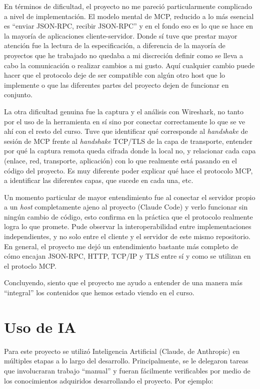 \documentclass[11pt]{article}
\begin{document}
En términos de dificultad, el proyecto no me pareció particularmente complicado
a nivel de implementación. El modelo mental de MCP, reducido a lo más esencial es
\enquote{enviar JSON-RPC, recibir JSON-RPC} y en el fondo eso es lo que se hace en
la mayoría de aplicaciones cliente-servidor. Donde sí tuve que prestar mayor atención fue
la lectura de la especificación, a diferencia de la mayoría de proyectos que he trabajado
no quedaba a mi discreción definir como se lleva a cabo la comunicación o realizar cambios
a mi gusto. Aquí cualquier cambio puede hacer que el protocolo deje de ser compatible
con algún otro host que lo implemente o que las diferentes partes del proyecto dejen
de funcionar en conjunto.

La otra dificultad genuina fue la captura y el análisis con Wireshark, no
tanto por el uso de la herramienta en sí sino por conectar correctamente
lo que se ve ahí con el resto del curso. Tuve que identificar qué corresponde al
\emph{handshake} de sesión de MCP frente al \emph{handshake} TCP/TLS de la
capa de transporte, entender por qué la captura remota queda cifrada donde
la local no, y relacionar cada capa (enlace, red, transporte, aplicación)
con lo que realmente está pasando en el código del proyecto. Es muy diferente
poder explicar qué hace el protocolo MCP, a identificar las diferentes capas, que
sucede en cada una, etc.

Un momento particular de mayor entendimiento fue al conectar el servidor
propio a un \emph{host} completamente ajeno al proyecto (Claude Code) y
verlo funcionar sin ningún cambio de código, esto confirma en la práctica que
el protocolo realmente logra lo que promete. Pude observar la interoperabilidad
entre implementaciones independientes, y no solo entre el cliente y el servidor
de este mismo repositorio. En general, el proyecto me dejó un entendimiento
bastante más completo de cómo encajan JSON-RPC, HTTP, TCP/IP y TLS entre
sí y como se utilizan en el protoclo MCP. 

Concluyendo, siento que el proyecto me ayudo a entender de una manera más ``integral''
los contenidos que hemos estado viendo en el curso.

\section{Uso de IA}

Para este proyecto se utilizó Inteligencia Artificial (Claude, de Anthropic) en múltiples
etapas a lo largo del desarrollo. Principalmente, se le delegaron tareas que involucraran trabajo
``manual'' y fueran fácilmente verificables por medio de los conocimientos adquiridos desarrollando
el proyecto. Por ejemplo:
\end{document}

